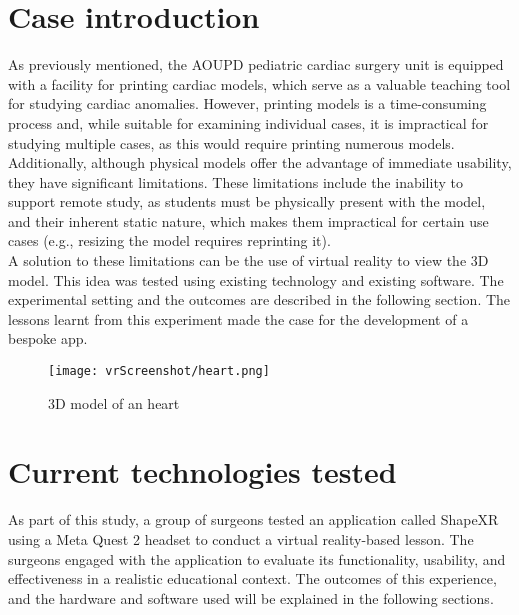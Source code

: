 \section{Case introduction}
\noindent
As previously mentioned, the \ac{AOUPD} pediatric cardiac surgery unit is equipped with a facility for printing cardiac models, which serve as a valuable teaching tool for studying cardiac anomalies.
However, printing models is a time-consuming process and, while suitable for examining individual cases, it is impractical for studying multiple cases, as this would require printing numerous models.
Additionally, although physical models offer the advantage of immediate usability, they have significant limitations.
These limitations include the inability to support remote study, as students must be physically present with the model, and their inherent static nature, which makes them impractical for certain use cases (e.g., resizing the model requires reprinting it).\\
A solution to these limitations can be the use of virtual reality to view the 3D model.
This idea was tested using existing technology and existing software. The experimental setting and the outcomes are described in the following section.
The lessons learnt from this experiment made the case for the development of a bespoke app. 

\begin{figure}[ht]
  \centering
  \texttt{[image: vrScreenshot/heart.png]}
  \caption{3D model of an heart}
  \label{fig:heart}
\end{figure}

\section{Current technologies tested}
\noindent
As part of this study, a group of surgeons tested an application called ShapeXR using a Meta Quest 2 headset to conduct a virtual reality-based lesson.
The surgeons engaged with the application to evaluate its functionality, usability, and effectiveness in a realistic educational context.
The outcomes of this experience, and the hardware and software used will be explained in the following sections.

